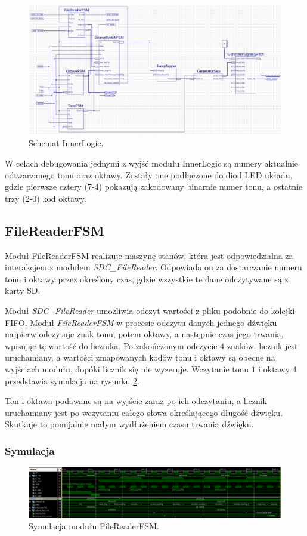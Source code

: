 \documentclass[12pt]{article}
\begin{document}
\begin{figure}[h]
  \centering
  \includegraphics[width=\linewidth]{images/inner}
  \caption{Schemat InnerLogic.}
  \label{sch:inner}
\end{figure}

W celach debugowania jednymi z wyjść modułu InnerLogic są numery aktualnie odtwarzanego tonu oraz oktawy. Zostały one podłączone do diod LED układu, gdzie pierwsze cztery (7-4) pokazują zakodowany binarnie numer tonu, a ostatnie trzy (2-0) kod oktawy. 

\subsection{FileReaderFSM}

Moduł FileReaderFSM realizuje maszynę stanów, która jest odpowiedzialna za interakcjem z modułem \textit{SDC\_FileReader}. Odpowiada on za dostarczanie numeru tonu i oktawy przez określony czas, gdzie wszystkie te dane odczytywane są z karty SD.

Moduł \textit{SDC\_FileReader} umożliwia odczyt wartości z pliku podobnie do kolejki FIFO. Moduł \textit{FileReaderFSM} w procesie odczytu danych jednego dźwięku najpierw odczytuje znak tonu, potem oktawy, a następnie czas jego trwania, wpisując tę wartość do licznika. Po zakończonym odczycie 4 znaków, licznik jest uruchamiany, a wartości zmapowanych kodów tonu i oktawy są obecne na wyjściach modułu, dopóki licznik się nie wyzeruje. Wczytanie tonu $1$ i oktawy $4$ przedstawia symulacja na rysunku \ref{sim:fileReader}.

Ton i oktawa podawane są na wyjście zaraz po ich odczytaniu, a licznik uruchamiany jest po wczytaniu całego słowa określającego długość dźwięku. Skutkuje to pomijalnie małym wydłużeniem czasu trwania dźwięku.
\subsubsection{Symulacja}
\begin{figure}[h]
  \centering
  \includegraphics[decodearray={1 0 1 0 1 0}, width=\linewidth]{images/filereader}
  \caption{Symulacja modułu FileReaderFSM.}
  \label{sim:fileReader}
\end{figure}
\end{document}
